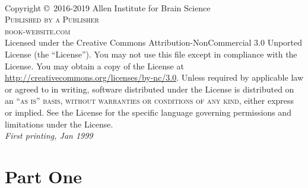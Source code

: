 \documentclass[11pt,fleqn]{book} %
\begin{document}

\newpage
~\vfill
\thispagestyle{empty}

\noindent Copyright \copyright\ 2016-2019 Allen Institute for Brain Science\\ %

\noindent \textsc{Published by a Publisher}\\ %

\noindent \textsc{book-website.com}\\ %

\noindent Licensed under the Creative Commons Attribution-NonCommercial 3.0 Unported License (the ``License''). You may not use this file except in compliance with the License. You may obtain a copy of the License at \url{http://creativecommons.org/licenses/by-nc/3.0}. Unless required by applicable law or agreed to in writing, software distributed under the License is distributed on an \textsc{``as is'' basis, without warranties or conditions of any kind}, either express or implied. See the License for the specific language governing permissions and limitations under the License.\\ %

\noindent \textit{First printing, Jan 1999} %

%
%
%
%
%
%
%



\part{Part One}
\end{document}
